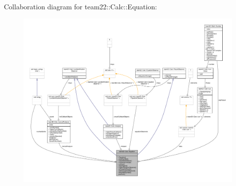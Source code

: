 Collaboration diagram for team22\+:\+:Calc\+:\+:Equation\+:
\nopagebreak
\begin{figure}[H]
\begin{center}
\leavevmode
\includegraphics[width=350pt]{classteam22_1_1_calc_1_1_equation__coll__graph}
\end{center}
\end{figure}
